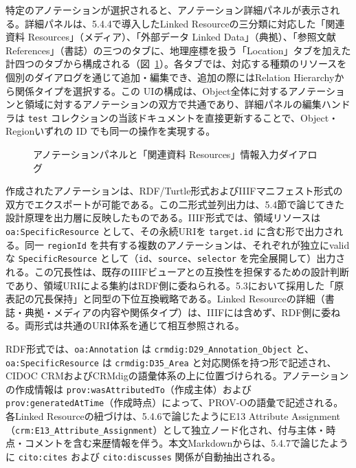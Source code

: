特定のアノテーションが選択されると、アノテーション詳細パネルが表示される。詳細パネルは、5.4.4で導入したLinked Resourceの三分類に対応した「関連資料 Resources」（メディア）、「外部データ Linked Data」（典拠）、「参照文献 References」（書誌）の三つのタブに、地理座標を扱う「Location」タブを加えた計四つのタブから構成される（図~\ref{fig:ch5-annotation-panel}）。各タブでは、対応する種類のリソースを個別のダイアログを通じて追加・編集でき、追加の際にはRelation Hierarchyから関係タイプを選択する。この UIの構成は、Object全体に対するアノテーションと領域に対するアノテーションの双方で共通であり、詳細パネルの編集ハンドラは \texttt{test} コレクションの当該ドキュメントを直接更新することで、Object・Regionいずれの ID でも同一の操作を実現する。

\begin{figure}[htbp]
  \centering
  \caption{アノテーションパネルと「関連資料 Resources」情報入力ダイアログ}
  \label{fig:ch5-annotation-panel}
\end{figure}

作成されたアノテーションは、RDF/Turtle形式およびIIIFマニフェスト形式の双方でエクスポートが可能である。この二形式並列出力は、5.4節で論じてきた設計原理を出力層に反映したものである。IIIF形式では、領域リソースは \texttt{oa:SpecificResource} として、その永続URIを \texttt{target.id} に含む形で出力される。同一 \texttt{regionId} を共有する複数のアノテーションは、それぞれが独立にvalidな \texttt{SpecificResource} として（\texttt{id}、\texttt{source}、\texttt{selector} を完全展開して）出力される。この冗長性は、既存のIIIFビューアとの互換性を担保するための設計判断であり、領域URIによる集約はRDF側に委ねられる。5.3において採用した「原表記の冗長保持」と同型の下位互換戦略である。Linked Resourceの詳細（書誌・典拠・メディアの内容や関係タイプ）は、IIIFには含めず、RDF側に委ねる。両形式は共通のURI体系を通じて相互参照される。

RDF形式では、\texttt{oa:Annotation} は \texttt{crmdig:D29\_Annotation\_Object} と、\texttt{oa:SpecificResource} は \texttt{crmdig:D35\_Area} と対応関係を持つ形で記述され、CIDOC CRMおよびCRMdigの語彙体系の上に位置づけられる。アノテーションの作成情報は \texttt{prov:wasAttributedTo}（作成主体）および \texttt{prov:generatedAtTime}（作成時点）によって、PROV-Oの語彙で記述される。各Linked Resourceの紐づけは、5.4.6で論じたようにE13 Attribute Assignment（\texttt{crm:E13\_Attribute\_Assignment}）として独立ノード化され、付与主体・時点・コメントを含む来歴情報を伴う。本文Markdownからは、5.4.7で論じたように \texttt{cito:cites} および \texttt{cito:discusses} 関係が自動抽出される。

